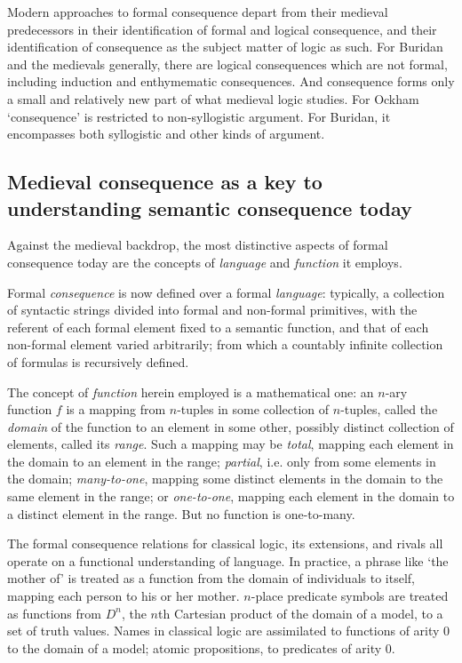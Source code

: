 \documentclass[]{article}
\begin{document}
		Modern approaches to formal consequence depart from their medieval predecessors in their identification of formal and logical consequence, and their identification of consequence as the subject matter of logic as such. For Buridan and the medievals generally, there are logical consequences which are not formal, including induction and enthymematic consequences. And consequence forms only a small and relatively new part of what medieval logic studies. For Ockham `consequence' is restricted to non-syllogistic argument. For Buridan, it encompasses both syllogistic and other kinds of argument.
		
		\subsection{Medieval consequence as a key to understanding semantic consequence today}
		
		Against the medieval backdrop, the most distinctive aspects of formal consequence today are the concepts of \textit{language} and \textit{function} it employs.
		
		Formal \textit{consequence} is now defined over a formal \textit{language}: typically, a collection of syntactic strings divided into formal and non-formal primitives, with the referent of each formal element fixed to a semantic function, and that of each non-formal element varied arbitrarily; from which a countably infinite collection of formulas is recursively defined. 
		
		The concept of \textit{function} herein employed is a mathematical one: an $n$-ary function $f$ is a mapping from $n$-tuples in some collection of $n$-tuples, called the \textit{domain} of the function to an element in some other, possibly distinct collection of elements, called its \textit{range}. Such a mapping may be \textit{total}, mapping each element in the domain to an element in the range; \textit{partial}, i.e. only from some elements in the domain; \textit{many-to-one}, mapping some distinct elements in the domain to the same element in the range; or \textit{one-to-one}, mapping each element in the domain to a distinct element in the range. But no function is one-to-many. 
		
		The formal consequence relations for classical logic, its extensions, and rivals all operate on a functional understanding of language. In practice, a phrase like `the mother of' is treated as a function from the domain of individuals to itself, mapping each person to his or her mother. $n$-place predicate symbols are treated as functions from $D^{n}$, the $n$th Cartesian product of the domain of a model, to a set of truth values. Names in classical logic are assimilated to functions of arity 0 to the domain of a model; atomic propositions, to predicates of arity 0.
		
\end{document}
